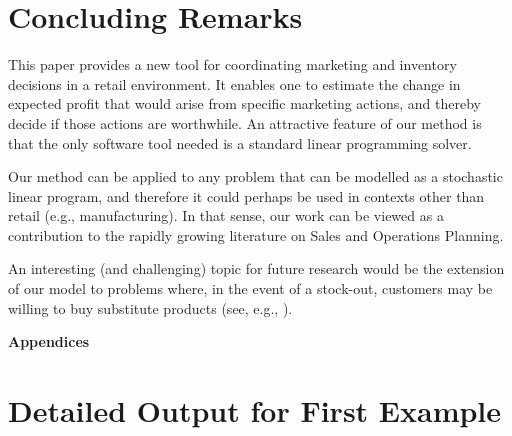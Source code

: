 \documentclass[a4paper,11pt]{article}
\begin{document}
\section{Concluding Remarks}
\label{se:conclusion}

This paper provides a new tool for coordinating marketing and inventory decisions in a retail environment. It enables one to estimate the change in expected profit that would arise from specific marketing actions, and thereby decide if those actions are worthwhile. An attractive feature of our method is that the only software tool needed is a standard linear programming solver.

Our method can be applied to any problem that can be modelled as a stochastic linear program, and therefore it could perhaps be used in contexts other than retail (e.g., manufacturing). In that sense, our work can be viewed as a contribution to the rapidly growing literature on Sales and Operations Planning.

An interesting (and challenging) topic for future research would be the extension of our model to problems where, in the event of a stock-out, customers may be willing to buy substitute products (see, e.g., \cite{Sh15,ZXS20}).

\printbibliography
\newpage
\begin{center}
{\bf\Large Appendices}
\end{center}

\appendix

\section{Detailed Output for First Example} \label{se:report}
\end{document}
